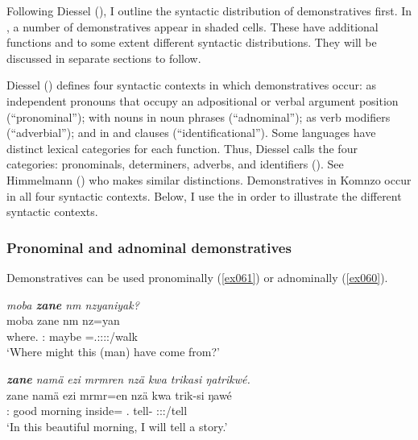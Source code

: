 Following Diessel (\citeyear{Diessel:2009tg}), I outline the syntactic distribution of demonstratives first. In , a number of demonstratives appear in shaded cells. These have additional functions and to some extent different syntactic distributions. They will be discussed in separate sections to follow.

Diessel (\citeyear{Diessel:2009tg}) defines four syntactic contexts in which demonstratives occur: as independent pronouns that occupy an adpositional or verbal argument position (``pronominal''); with nouns in noun phrases (``adnominal''); as verb modifiers (``adverbial''); and in  and  clauses (``identificational''). Some languages have distinct lexical categories for each function. Thus, Diessel calls the four categories:  pronominals,  determiners,  adverbs, and  identifiers (\citeyear[3]{Diessel:2009tg}). See Himmelmann (\citeyear{Himmelmann:1996tp}) who makes similar distinctions. Demonstratives in Komnzo occur in all four syntactic contexts. Below, I use the  in order to illustrate the different syntactic contexts.

\subsubsection{Pronominal and adnominal demonstratives} \label{pronominal-demonstratives-subsec}

Demonstratives can be used pronominally (\ref{ex061}) or adnominally (\ref{ex060}).

\begin{exe}
	\ex \emph{moba \textbf{zane} nm nzyaniyak?}\\
	\gll moba zane nm nz=yan\\
	where.{\Abl} \Dem:{\Prox} maybe \Immpst=\Tsg.\Masc:\Sbj:\Nonpast:\Ipfv:\Venit/walk\\
	\trans `Where might this (man) have come from?' 
	\label{ex061}
\end{exe}
\begin{exe}
	\ex \emph{\textbf{zane} namä ezi mrmren nzä kwa trikasi ŋatrikwé.}\\
	\gll zane namä ezi mrmr=en nzä kwa trik-si ŋawé\\
	\Dem:{\Prox} good morning inside={\Loc} \Fsg.{\Abs} {\Fut} tell-{\Nmlz} \Fsg:\Sbj:\Nonpast:\Ipfv/tell\\
	\trans `In this beautiful morning, I will tell a story.' 
	\label{ex060}
\end{exe}

